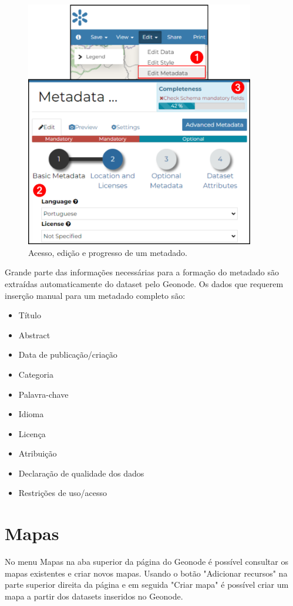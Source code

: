 \documentclass[12pt]{article}
\begin{document}
\begin{figure}[ht]
  \centering
  \includegraphics[width=10cm, keepaspectratio]{img/metadado.pdf}
  \caption{Acesso, edição e progresso de um metadado.}
  \label{fig:metadado}
\end{figure}

Grande parte das informações necessárias para a formação do metadado são
extraídas automaticamente do dataset pelo Geonode. Os dados que requerem
inserção manual para um metadado completo são:

\begin{itemize}
  \item Título
  \item Abstract
  \item Data de publicação/criação
  \item Categoria
  \item Palavra-chave
  \item Idioma
  \item Licença
  \item Atribuição
  \item Declaração de qualidade dos dados
  \item Restrições de uso/acesso
\end{itemize}

\section{Mapas}

No menu Mapas na aba superior da página do Geonode é possível consultar os
mapas existentes e criar novos mapas. Usando o botão "Adicionar recursos" na
parte superior direita da página e em seguida "Criar mapa" é possível criar um
mapa a partir dos datasets inseridos no Geonode.



\end{document}
